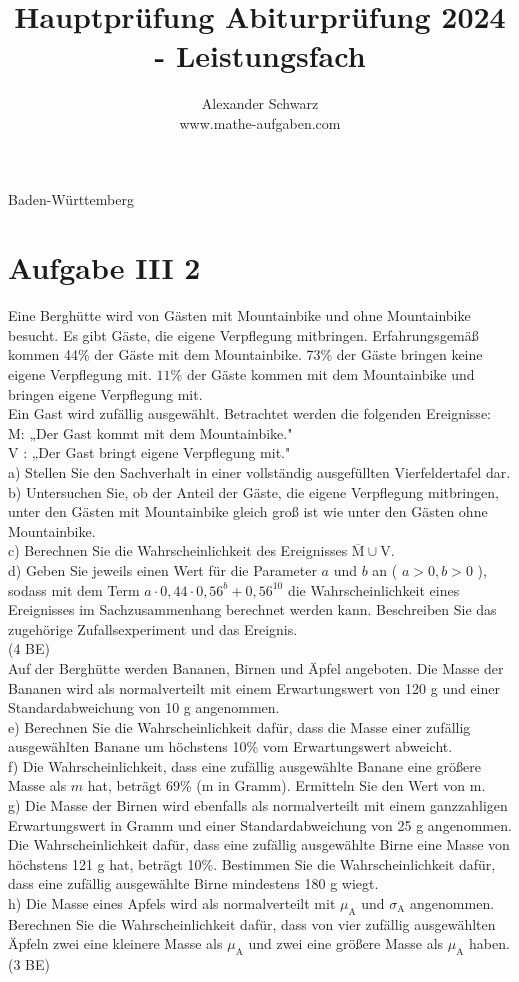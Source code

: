 \documentclass[10pt]{article}
\title{Hauptprüfung Abiturprüfung 2024 - Leistungsfach }
\author{Alexander Schwarz\\
www.mathe-aufgaben.com}
\date{}
\begin{document}
\maketitle
 Baden-Württemberg

\section*{Aufgabe III 2}
Eine Berghütte wird von Gästen mit Mountainbike und ohne Mountainbike besucht. Es gibt Gäste, die eigene Verpflegung mitbringen. Erfahrungsgemäß kommen 44\% der Gäste mit dem Mountainbike. 73\% der Gäste bringen keine eigene Verpflegung mit. $11 \%$ der Gäste kommen mit dem Mountainbike und bringen eigene Verpflegung mit.\\
Ein Gast wird zufällig ausgewählt. Betrachtet werden die folgenden Ereignisse: M: „Der Gast kommt mit dem Mountainbike."\\
V : „Der Gast bringt eigene Verpflegung mit."\\
a) Stellen Sie den Sachverhalt in einer vollständig ausgefüllten Vierfeldertafel dar.\\
b) Untersuchen Sie, ob der Anteil der Gäste, die eigene Verpflegung mitbringen, unter den Gästen mit Mountainbike gleich groß ist wie unter den Gästen ohne Mountainbike.\\
c) Berechnen Sie die Wahrscheinlichkeit des Ereignisses $\overline{\mathrm{M}} \cup \mathrm{V}$.\\
d) Geben Sie jeweils einen Wert für die Parameter $a$ und $b$ an ( $a>0, b>0$ ), sodass mit dem Term $a \cdot 0,44 \cdot 0,56^{b}+0,56^{10}$ die Wahrscheinlichkeit eines Ereignisses im Sachzusammenhang berechnet werden kann. Beschreiben Sie das zugehörige Zufallsexperiment und das Ereignis.\\
(4 BE)\\
Auf der Berghütte werden Bananen, Birnen und Äpfel angeboten. Die Masse der Bananen wird als normalverteilt mit einem Erwartungswert von 120 g und einer Standardabweichung von 10 g angenommen.\\
e) Berechnen Sie die Wahrscheinlichkeit dafür, dass die Masse einer zufällig ausgewählten Banane um höchstens 10\% vom Erwartungswert abweicht.\\
f) Die Wahrscheinlichkeit, dass eine zufällig ausgewählte Banane eine größere Masse als $m$ hat, beträgt 69\% (m in Gramm). Ermitteln Sie den Wert von m.\\
g) Die Masse der Birnen wird ebenfalls als normalverteilt mit einem ganzzahligen Erwartungswert in Gramm und einer Standardabweichung von 25 g angenommen. Die Wahrscheinlichkeit dafür, dass eine zufällig ausgewählte Birne eine Masse von höchstens 121 g hat, beträgt 10\%. Bestimmen Sie die Wahrscheinlichkeit dafür, dass eine zufällig ausgewählte Birne mindestens 180 g wiegt.\\
h) Die Masse eines Apfels wird als normalverteilt mit $\mu_{\mathrm{A}}$ und $\sigma_{\mathrm{A}}$ angenommen. Berechnen Sie die Wahrscheinlichkeit dafür, dass von vier zufällig ausgewählten Äpfeln zwei eine kleinere Masse als $\mu_{\mathrm{A}}$ und zwei eine größere Masse als $\mu_{\mathrm{A}}$ haben.\\
(3 BE)
\end{document}
